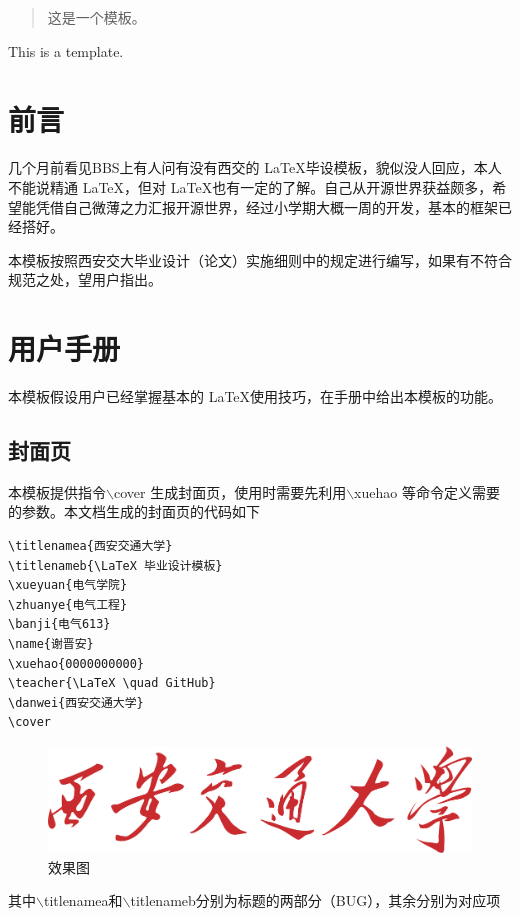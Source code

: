 \documentclass[bachelor]{XJTUthesis}
\begin{document}
\cover


\tableofcontents
\thispagestyle{empty}
\setcounter{page}{0}
\newpage

\begin{abstract}
这是一个模板。
\end{abstract}
\newpage
\begin{eabstract}
This is a template.
\end{eabstract}

\chapter{前言}
几个月前看见BBS上有人问有没有西交的 \LaTeX 毕设模板，貌似没人回应，本人不能说精通 \LaTeX ，但对 \LaTeX 也有一定的了解。自己从开源世界获益颇多，希望能凭借自己微薄之力汇报开源世界，经过小学期大概一周的开发，基本的框架已经搭好。\par
本模板按照西安交大毕业设计（论文）实施细则中的规定进行编写，如果有不符合规范之处，望用户指出。

\chapter{用户手册}
本模板假设用户已经掌握基本的 \LaTeX 使用技巧，在手册中给出本模板的功能。
\section{封面页}
本模板提供指令$\backslash$cover 生成封面页，使用时需要先利用$\backslash$xuehao 等命令定义需要的参数。本文档生成的封面页的代码如下
\begin{lstlisting}
\titlenamea{西安交通大学}
\titlenameb{\LaTeX 毕业设计模板}
\xueyuan{电气学院}
\zhuanye{电气工程}
\banji{电气613}
\name{谢晋安}
\xuehao{0000000000}
\teacher{\LaTeX \quad GitHub}
\danwei{西安交通大学}
\cover
\end{lstlisting}

\begin{figure}[htbp]
  \centering
  \includegraphics[width=1\textwidth]{figures//a2_1zwxm.png}
  \caption{效果图}
\end{figure}
其中$\backslash$titlenamea和$\backslash$titlenameb分别为标题的两部分（BUG），其余分别为对应项
\end{document}
